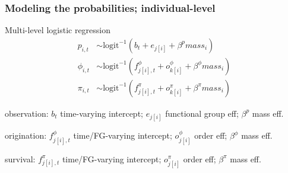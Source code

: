 \documentclass[aspectratio=169]{beamer}
\begin{document}
\begin{frame}
  \frametitle{Modeling the probabilities; individual-level}
  \begin{block}{Multi-level logistic regression}
    \begin{align*}
      p_{i, t} &\sim \text{logit}^{-1}(b_{t} + e_{j[i]} + \beta^{p} mass_{i}) \\
      \phi_{i, t} &\sim \text{logit}^{-1}(f^{\phi}_{j[i], t} + o^{\phi}_{k[i]} + \beta^{\phi} mass_{i}) \\
      \pi_{i, t} &\sim \text{logit}^{-1}(f^{\pi}_{j[i], t} + o^{\pi}_{k[i]} + \beta^{\pi} mass_{i})
    \end{align*}
    \begin{scriptsize}
      observation: \(b_{t}\) time-varying intercept; \(e_{j[i]}\) functional group eff; \(\beta^{p}\) mass eff.

      origination: \(f^{\phi}_{j[i], t}\) time/FG-varying intercept; \(o^{\phi}_{j[i]}\) order eff; \(\beta^{\phi}\) mass eff.

      survival: \(f^{\pi}_{j[i], t}\) time/FG-varying intercept; \(o^{\pi}_{j[i]}\) order eff; \(\beta^{\pi}\) mass eff.
    \end{scriptsize}
  \end{block}
\end{frame}
\end{document}
